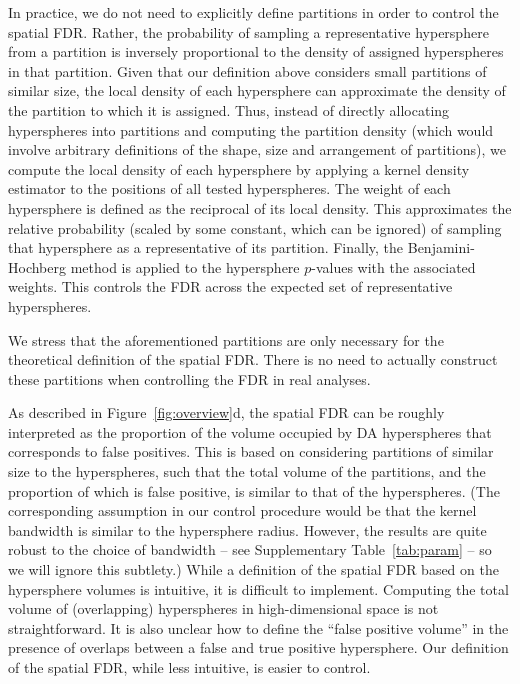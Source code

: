 \documentclass{article}
\begin{document}
In practice, we do not need to explicitly define partitions in order to control the spatial FDR.
Rather, the probability of sampling a representative hypersphere from a partition is inversely proportional to the density of assigned hyperspheres in that partition.
Given that our definition above considers small partitions of similar size, the local density of each hypersphere can approximate the density of the partition to which it is assigned.
Thus, instead of directly allocating hyperspheres into partitions and computing the partition density (which would involve arbitrary definitions of the shape, size and arrangement of partitions), we compute the local density of each hypersphere by applying a kernel density estimator to the positions of all tested hyperspheres.
The weight of each hypersphere is defined as the reciprocal of its local density.
This approximates the relative probability (scaled by some constant, which can be ignored) of sampling that hypersphere as a representative of its partition.
Finally, the Benjamini-Hochberg method is applied to the hypersphere $p$-values with the associated weights.
This controls the FDR across the expected set of representative hyperspheres.

We stress that the aforementioned partitions are only necessary for the theoretical definition of the spatial FDR.
There is no need to actually construct these partitions when controlling the FDR in real analyses.

As described in Figure~\ref{fig:overview}d, the spatial FDR can be roughly interpreted as the proportion of the volume occupied by DA hyperspheres that corresponds to false positives.
This is based on considering partitions of similar size to the hyperspheres, such that the total volume of the partitions, and the proportion of which is false positive, is similar to that of the hyperspheres.
(The corresponding assumption in our control procedure would be that the kernel bandwidth is similar to the hypersphere radius.
However, the results are quite robust to the choice of bandwidth -- see Supplementary Table~\ref{tab:param} -- so we will ignore this subtlety.)
While a definition of the spatial FDR based on the hypersphere volumes is intuitive, it is difficult to implement.
Computing the total volume of (overlapping) hyperspheres in high-dimensional space is not straightforward.
It is also unclear how to define the ``false positive volume'' in the presence of overlaps between a false and true positive hypersphere.
Our definition of the spatial FDR, while less intuitive, is easier to control.
\end{document}
